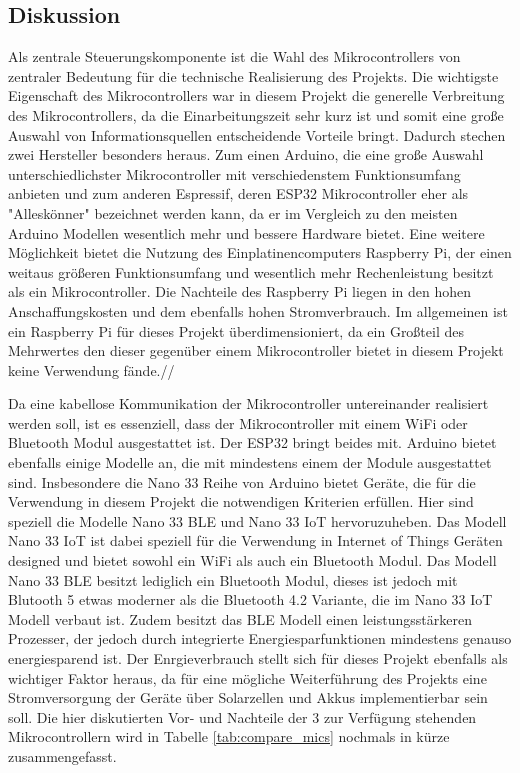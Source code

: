     \subsection{Diskussion}
        Als zentrale Steuerungskomponente ist die Wahl des Mikrocontrollers von zentraler Bedeutung für die technische Realisierung des Projekts. Die wichtigste Eigenschaft des Mikrocontrollers war in diesem Projekt die generelle Verbreitung des Mikrocontrollers, da die Einarbeitungszeit sehr kurz ist und somit eine große Auswahl von Informationsquellen entscheidende Vorteile bringt. Dadurch stechen zwei Hersteller besonders heraus. Zum einen Arduino, die eine große Auswahl unterschiedlichster Mikrocontroller mit verschiedenstem Funktionsumfang anbieten und zum anderen Espressif, deren ESP32 Mikrocontroller eher als "Alleskönner" bezeichnet werden kann, da er im Vergleich zu den meisten Arduino Modellen wesentlich mehr und bessere Hardware bietet.
        Eine weitere Möglichkeit bietet die Nutzung des Einplatinencomputers Raspberry Pi, der einen weitaus größeren Funktionsumfang und wesentlich mehr Rechenleistung besitzt als ein Mikrocontroller. Die Nachteile des Raspberry Pi liegen in den hohen Anschaffungskosten und dem ebenfalls hohen Stromverbrauch. Im allgemeinen ist ein Raspberry Pi für dieses Projekt überdimensioniert, da ein Großteil des Mehrwertes den dieser gegenüber einem Mikrocontroller bietet in diesem Projekt keine Verwendung fände.//
        
        Da eine kabellose Kommunikation der Mikrocontroller untereinander realisiert werden soll, ist es essenziell, dass der Mikrocontroller mit einem WiFi oder Bluetooth Modul ausgestattet ist. Der ESP32 bringt beides mit. Arduino bietet ebenfalls einige Modelle an, die mit mindestens einem der Module ausgestattet sind. Insbesondere die Nano 33 Reihe von Arduino bietet Geräte, die für die Verwendung in diesem Projekt die notwendigen Kriterien erfüllen. Hier sind speziell die Modelle Nano 33 BLE und Nano 33 IoT hervoruzuheben. Das Modell Nano 33 IoT ist dabei speziell für die Verwendung in Internet of Things Geräten designed und bietet sowohl ein WiFi als auch ein Bluetooth Modul. Das Modell Nano 33 BLE besitzt lediglich ein Bluetooth Modul, dieses ist jedoch mit Blutooth 5 etwas moderner als die Bluetooth 4.2 Variante, die im Nano 33 IoT Modell verbaut ist. Zudem besitzt das BLE Modell einen leistungsstärkeren Prozesser, der jedoch durch integrierte Energiesparfunktionen mindestens genauso energiesparend ist. Der Enrgieverbrauch stellt sich für dieses Projekt ebenfalls als wichtiger Faktor heraus, da für eine mögliche Weiterführung des Projekts eine Stromversorgung der Geräte über Solarzellen und Akkus implementierbar sein soll. Die hier diskutierten Vor- und Nachteile der 3 zur Verfügung stehenden Mikrocontrollern wird in Tabelle \ref{tab:compare_mics} nochmals in kürze zusammengefasst.

